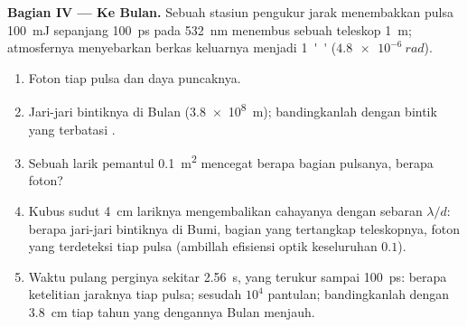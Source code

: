 \begin{problem}
\textbf{Bagian IV --- Ke Bulan.}
Sebuah stasiun pengukur jarak menembakkan pulsa \qty{100}{mJ} sepanjang \qty{100}{ps} pada
\qty{532}{nm} menembus sebuah teleskop \qty{1}{m}; atmosfernya menyebarkan
berkas keluarnya menjadi \qty{1}{''} ($\qty{4.8e-6}{rad}$).
\begin{enumerate}[resume]
  \item Foton tiap pulsa dan daya puncaknya.
  \item Jari-jari bintiknya di Bulan (\qty{3.8e8}{m}); bandingkanlah dengan
        bintik yang terbatasi .
  \item Sebuah larik pemantul \qty{0.1}{m^2} mencegat berapa bagian
        pulsanya, berapa foton?
  \item Kubus sudut \qty{4}{cm} lariknya mengembalikan cahayanya dengan
        sebaran $\lambda/d$: berapa jari-jari bintiknya di Bumi, bagian yang tertangkap
        teleskopnya, foton yang terdeteksi tiap pulsa (ambillah efisiensi optik
        keseluruhan $0.1$).
  \item Waktu pulang perginya sekitar \qty{2.56}{s}, yang terukur sampai
        \qty{100}{ps}: berapa ketelitian jaraknya tiap pulsa; sesudah $10^4$
        pantulan; bandingkanlah dengan \qty{3.8}{cm} tiap tahun yang dengannya
        Bulan menjauh.
\end{enumerate}
\end{problem}
